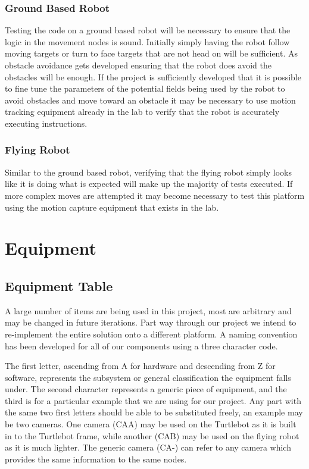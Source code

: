 \documentclass{article}
\begin{document}
	\subsubsection{Ground Based Robot}
	
	Testing the code on a ground based robot will be necessary to ensure that the logic in the movement nodes is sound. Initially simply having the robot follow moving targets or turn to face targets that are not head on will be sufficient. As obstacle avoidance gets developed ensuring that the robot does avoid the obstacles will be enough. If the project is sufficiently developed that it is possible to fine tune the parameters of the potential fields being used by the robot to avoid obstacles and move toward an obstacle it may be necessary to use motion tracking equipment already in the lab to verify that the robot is accurately executing instructions.
	
	\subsubsection{Flying Robot}
	
	Similar to the ground based robot, verifying that the flying robot simply looks like it is doing what is expected will make up the majority of tests executed. If more complex moves are attempted it may become necessary to test this platform using the motion capture equipment that exists in the lab.


\section{Equipment}

	\subsection{Equipment Table}
	
	A large number of items are being used in this project, most are arbitrary and may be changed in future iterations. Part way through our project we intend to re-implement the entire solution onto a 	different platform. A naming convention has been developed for all of our components using a three character code.
	
	The first letter, ascending from A for hardware and descending from Z for software, represents the subsystem or general classification the equipment falls under. The second character represents a generic piece of equipment, and the third is for a particular example that we are using for our project. Any part with the same two first letters should be able to be substituted freely, an example may be two cameras. One camera (CAA) may be used on the Turtlebot as it is built in to the Turtlebot frame, while another (CAB) may be used on the flying robot as it is much lighter. The generic camera (CA-) can refer to any camera which provides the same information to the same nodes.
	
\end{document}
